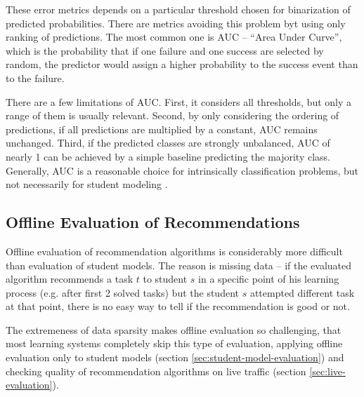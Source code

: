 These error metrics depends on a particular threshold chosen
  for binarization of predicted probabilities.
There are metrics avoiding this problem byt using only ranking of predictions.
The most common one is AUC -- ``Area Under Curve'',
  which is the probability that if one failure and one success are selected by random,
  the predictor would assign a higher probability to the success event than to the failure.

There are a few limitations of AUC.
First, it considers all thresholds, but only a range of them is usually relevant.
Second, by only considering the ordering of predictions,
  if all predictions are multiplied by a constant, AUC remains unchanged.
Third, if the predicted classes are strongly unbalanced, AUC of nearly 1
  can be achieved by a simple baseline predicting the majority class.
Generally, AUC is a reasonable choice for intrinsically classification problems,
  but not necessarily for student modeling \cite{pelanek-evaluation-student-models}.


\subsection{Offline Evaluation of Recommendations}


Offline evaluation of recommendation algorithms is considerably more difficult
  than evaluation of student models.
The reason is missing data --
  if the evaluated algorithm recommends a task $t$ to student $s$
  in a specific point of his learning process (e.g. after first 2 solved tasks)
  but the student $s$ attempted different task at that point,
  there is no easy way to tell if the recommendation is good or not.

The extremeness of data sparsity makes offline evaluation so challenging,
  that most learning systems completely skip this type of evaluation,
  applying offline evaluation only to student models
  (section \ref{sec:student-model-evaluation})
  and checking quality of recommendation algorithms on live traffic
  (section \ref{sec:live-evaluation}).

